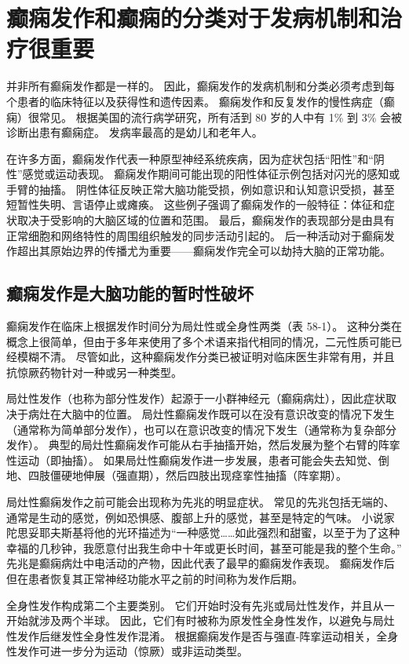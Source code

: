 \section{癫痫发作和癫痫的分类对于发病机制和治疗很重要}

并非所有癫痫发作都是一样的。
因此，癫痫发作的发病机制和分类必须考虑到每个患者的临床特征以及获得性和遗传因素。
癫痫发作和反复发作的慢性病症（癫痫）很常见。
根据美国的流行病学研究，所有活到 80 岁的人中有 1\% 到 3\% 会被诊断出患有癫痫症。
发病率最高的是幼儿和老年人。


在许多方面，癫痫发作代表一种原型神经系统疾病，因为症状包括“阳性”和“阴性”感觉或运动表现。
癫痫发作期间可能出现的阳性体征示例包括对闪光的感知或手臂的抽搐。
阴性体征反映正常大脑功能受损，例如意识和认知意识受损，甚至短暂性失明、言语停止或瘫痪。
这些例子强调了癫痫发作的一般特征：体征和症状取决于受影响的大脑区域的位置和范围。
最后，癫痫发作的表现部分是由具有正常细胞和网络特性的周围组织触发的同步活动引起的。
后一种活动对于癫痫发作超出其原始边界的传播尤为重要——癫痫发作完全可以劫持大脑的正常功能。



\subsection{癫痫发作是大脑功能的暂时性破坏}

癫痫发作在临床上根据发作时间分为局灶性或全身性两类（表 58-1）。
这种分类在概念上很简单，但由于多年来使用了多个术语来指代相同的情况，二元性质可能已经模糊不清。
尽管如此，这种癫痫发作分类已被证明对临床医生非常有用，并且抗惊厥药物针对一种或另一种类型。


局灶性发作（也称为部分性发作）起源于一小群神经元（癫痫病灶），因此症状取决于病灶在大脑中的位置。
局灶性癫痫发作既可以在没有意识改变的情况下发生（通常称为简单部分发作），也可以在意识改变的情况下发生（通常称为复杂部分发作）。
典型的局灶性癫痫发作可能从右手抽搐开始，然后发展为整个右臂的阵挛性运动（即抽搐）。
如果局灶性癫痫发作进一步发展，患者可能会失去知觉、倒地、四肢僵硬地伸展（强直期），然后四肢出现痉挛性抽搐（阵挛期）。


局灶性癫痫发作之前可能会出现称为先兆的明显症状。
常见的先兆包括无端的、通常是生动的感觉，例如恐惧感、腹部上升的感觉，甚至是特定的气味。
小说家陀思妥耶夫斯基将他的光环描述为“一种感觉……如此强烈和甜蜜，以至于为了这种幸福的几秒钟，我愿意付出我生命中十年或更长时间，甚至可能是我的整个生命。” 
先兆是癫痫病灶中电活动的产物，因此代表了最早的癫痫发作表现。
癫痫发作后但在患者恢复其正常神经功能水平之前的时间称为发作后期。


全身性发作构成第二个主要类别。 它们开始时没有先兆或局灶性发作，并且从一开始就涉及两个半球。
因此，它们有时被称为原发性全身性发作，以避免与局灶性发作后继发性全身性发作混淆。
根据癫痫发作是否与强直-阵挛运动相关，全身性发作可进一步分为运动（惊厥）或非运动类型。


